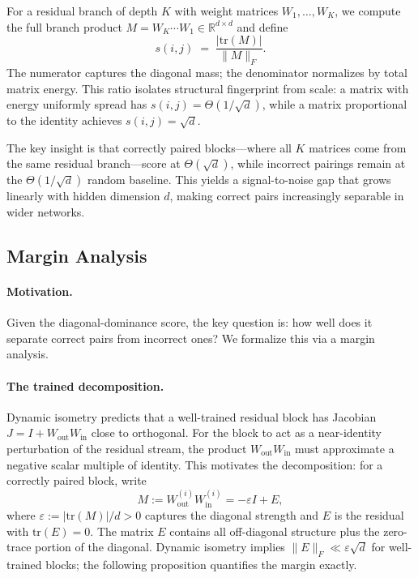 \documentclass[wcp]{jmlr}
\begin{document}
For a residual branch of depth $K$ with weight matrices $W_1, \ldots, W_K$, we compute the full branch product $M = W_K \cdots W_1 \in \mathbb{R}^{d \times d}$ and define
\begin{equation}\label{eq:dd-score}
  s(i,j) \;=\; \frac{|\mathrm{tr}(M)|}{\|M\|_F}.
\end{equation}
The numerator captures the diagonal mass; the denominator normalizes by total matrix energy. This ratio isolates structural fingerprint from scale: a matrix with energy uniformly spread has $s(i,j) = \Theta(1/\sqrt{d})$, while a matrix proportional to the identity achieves $s(i,j) = \sqrt{d}$.

The key insight is that correctly paired blocks---where all $K$ matrices come from the same residual branch---score at $\Theta(\sqrt{d})$, while incorrect pairings remain at the $\Theta(1/\sqrt{d})$ random baseline. This yields a signal-to-noise gap that grows linearly with hidden dimension $d$, making correct pairs increasingly separable in wider networks.

\subsection{Margin Analysis}\label{sec:margin-analysis}

\paragraph{Motivation.} Given the diagonal-dominance score, the key question is: how well does it separate correct pairs from incorrect ones? We formalize this via a margin analysis.

\paragraph{The trained decomposition.} Dynamic isometry \citep{pennington2017isometry} predicts that a well-trained residual block has Jacobian $J = I + W_{\mathrm{out}} W_{\mathrm{in}}$ close to orthogonal. For the block to act as a near-identity perturbation of the residual stream, the product $W_{\mathrm{out}} W_{\mathrm{in}}$ must approximate a negative scalar multiple of identity. This motivates the decomposition: for a correctly paired block, write
\begin{equation}\label{eq:decomp}
  M := W_{\mathrm{out}}^{(i)} W_{\mathrm{in}}^{(i)} = -\varepsilon I + E,
\end{equation}
where $\varepsilon := |\mathrm{tr}(M)|/d > 0$ captures the diagonal strength and $E$ is the residual with $\mathrm{tr}(E) = 0$. The matrix $E$ contains all off-diagonal structure plus the zero-trace portion of the diagonal. Dynamic isometry implies $\|E\|_F \ll \varepsilon\sqrt{d}$ for well-trained blocks; the following proposition quantifies the margin exactly.
\end{document}
